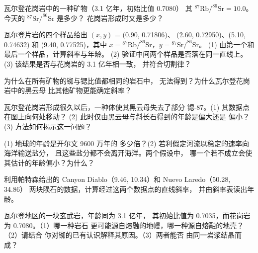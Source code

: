 \begin{exercise}[$\star\star$]\label{exo:g12:age-of-the-earth:6}
瓦尔登花岗岩中的一种矿物（3.1 亿年，初始比值 0.7080）
其 $^{87}\mathrm{Rb}/^{86}\mathrm{Sr} = 10.0$。今天的
$^{87}\mathrm{Sr}/^{86}\mathrm{Sr}$ 是多少？
花岗岩形成时又是多少？
\end{exercise}

\begin{exercise}[$\star\star$]\label{exo:g12:age-of-the-earth:7}
瓦尔登片岩的四个样品给出 $(x, y)$ = (0.90, 0.71806)、
(2.60, 0.72950)、(5.10, 0.74632) 和 (9.40, 0.77525)，其中 $x =
{}^{87}\mathrm{Rb}/^{86}\mathrm{Sr}$，$y = {}^{87}\mathrm{Sr}/^{86}\mathrm{Sr}$。
(1) 由第一个和最后一个样品，计算斜率与年龄。
(2) 验证中间两个样品是否落在同一直线上。
(3) 该结果是否与花岗岩的 3.1 亿年相一致，
并符合切割律？
\end{exercise}

\begin{exercise}[$\star\star$]\label{exo:g12:age-of-the-earth:8}
为什么在所有矿物的铷与锶比值都相同的岩石中，
无法得到？为什么瓦尔登花岗岩中的黑云母
比其他矿物更能确定斜率？
\end{exercise}

\begin{exercise}[$\star\star$]\label{exo:g12:age-of-the-earth:9}
瓦尔登花岗岩形成很久以后，一种体使其黑云母失去了部分
锶-87。(1) 其数据点在图上向何处移动？
(2) 此时仅由黑云母与斜长石得到的年龄是偏大还是
偏小？(3) 方法如何揭示这一问题？
\end{exercise}

\begin{exercise}[$\star\star$]\label{exo:g12:age-of-the-earth:10}
(1) 地球的年龄是开尔文 9600 万年的
多少倍？(2) 若利假定河流以稳定的速率向海洋输送盐分，
且这些盐分都不会离开海洋。两个假设中，
哪一个若不成立会使其估计的年龄偏小？为什么？
\end{exercise}

\begin{exercise}[$\star\star$]\label{exo:g12:age-of-the-earth:11}
利用帕特森给出的 Canyon Diablo（9.46, 10.34）和 Nuevo Laredo（50.28, 34.86）
两块陨石的数据，计算经过这两个数据点的直线斜率，
并由斜率表读出年龄。
\end{exercise}

\begin{exercise}[$\star\star\star$]\label{exo:g12:age-of-the-earth:12}
瓦尔登地区的一块玄武岩，年龄同为 3.1 亿年，
其初始比值为 0.7035，而花岗岩为 0.7080。（1）哪一种岩石
更可能源自熔融的地幔，哪一种源自熔融的地壳？（2）请结合
你对铷的已有认识解释其原因。（3）两者能否
由同一岩浆结晶而成？
\end{exercise}

